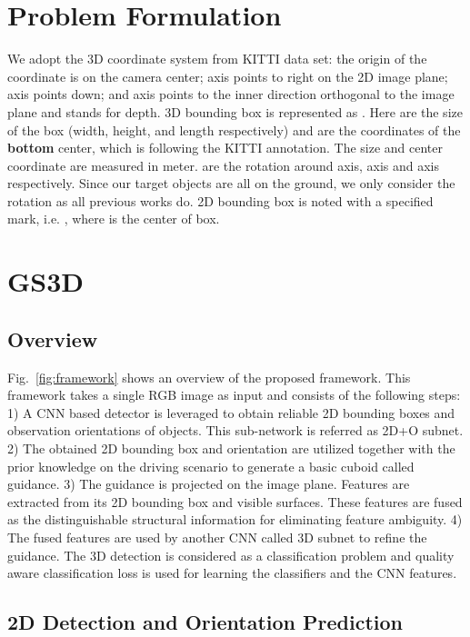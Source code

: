 \documentclass[10pt,twocolumn,letterpaper]{article}
\begin{document}
\section{Problem Formulation}
\label{sec:form}
We adopt the 3D coordinate system from KITTI data set: the origin of the coordinate is on the camera center;  axis points to right on the 2D image plane;  axis points down; and  axis points to the inner direction orthogonal to the image plane and stands for depth. 
3D bounding box is represented as . Here  are the size of the box (width, height, and length respectively) and  are the coordinates of the \textbf{bottom} center, which is following the KITTI annotation. The size and center coordinate are measured in meter.  are the rotation around  axis,  axis and  axis respectively. Since our target objects are all on the ground, we only consider the  rotation as all previous works do. 
2D bounding box is noted with a specified mark, i.e. , where  is the center of box.



\section{GS3D}

\subsection{Overview}

Fig.~\ref{fig:framework} shows an overview of the proposed framework. 
This framework takes a single RGB image as input and consists of the following steps: 1) A CNN based detector is leveraged to obtain reliable 2D bounding boxes and observation orientations of objects. This sub-network is referred as 2D+O subnet. 2) The obtained 2D bounding box and orientation are utilized together with the prior knowledge on the driving scenario to generate a basic cuboid called guidance. 3) The guidance is projected on the image plane. Features are extracted from its 2D bounding box and visible surfaces. These features are fused as the distinguishable structural information for eliminating feature ambiguity. 4) The fused features are used by another CNN called 3D subnet to refine the guidance. The 3D detection is considered as a classification problem and quality aware classification loss is used for learning the classifiers and the CNN features.

\subsection{2D Detection and Orientation Prediction}
\end{document}
